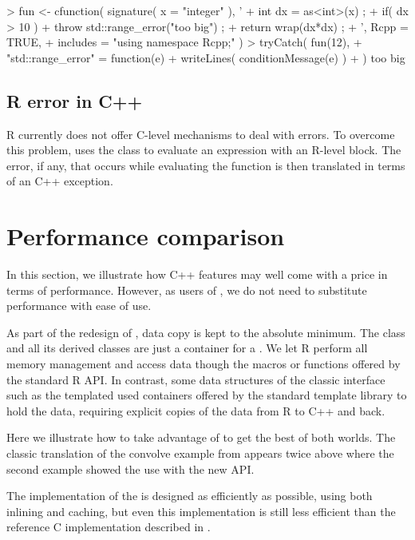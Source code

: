 \begin{example}
> fun <- cfunction( signature( x = "integer" ), '
+  int dx = as<int>(x) ;
+   if( dx > 10 ) 
+      throw std::range_error("too big") ;
+   return wrap(dx*dx) ;
+ ', Rcpp = TRUE, 
+  includes = "using namespace Rcpp;" )
> tryCatch( fun(12), 
+ "std::range_error" = function(e){
+    writeLines( conditionMessage(e) )
+ } )
too big
\end{example}

\subsection{R error in C++}

R currently does not offer C-level mechanisms to deal with errors. To 
overcome this problem,  uses the 
class to evaluate an expression with an R-level 
block. The error, if any, that occurs while evaluating the 
function is then translated in terms of an C++ exception. 

\section{Performance comparison}

In this section, we illustrate how C++ features may well come with a price
in terms of performance. However, as users of , we do not need to
substitute performance with ease of use.

As part of the redesign of , data copy is kept to the
absolute minimum. The  class and all its derived
classes are just a container for a . We let R perform
all memory management and access data though the macros or functions
offered by the standard R API. In contrast, some data structures
of the classic  interface such as the templated 
 used containers offered by the standard template
library to hold the data, requiring explicit copies of the data 
from R to C++ and back.

Here we illustrate how to take advantage of  to get
the best of both worlds. The classic  translation of the convolve example from
\cite{R:exts} appears twice above where the second example showed the use
with the new API.

The implementation of the  is designed as 
efficiently as possible, using both inlining and caching, 
but even this implementation is still less efficient than the 
reference C implementation described in \cite{R:exts}.

